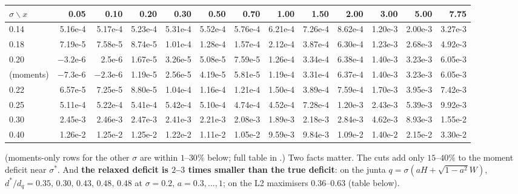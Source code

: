\begin{center}\scriptsize
\begin{adjustbox}{max width=\linewidth}\begin{tabular}{l|rrrrrrrrrrrr}\toprule
$\sigma\backslash x$ & 0.05 & 0.10 & 0.20 & 0.30 & 0.50 & 0.70 & 1.00 & 1.50 & 2.00 & 3.00 & 5.00 & 7.75\\\midrule
0.14 & 5.16e-4 & 5.17e-4 & 5.23e-4 & 5.31e-4 & 5.52e-4 & 5.76e-4 & 6.21e-4 & 7.26e-4 & 8.62e-4 & 1.20e-3 & 2.00e-3 & 3.27e-3\\
0.18 & 7.19e-5 & 7.58e-5 & 8.74e-5 & 1.01e-4 & 1.28e-4 & 1.57e-4 & 2.12e-4 & 3.87e-4 & 6.30e-4 & 1.23e-3 & 2.68e-3 & 4.92e-3\\
0.20 & $-3.2$e-6 & 2.5e-6 & 1.67e-5 & 3.26e-5 & 5.08e-5 & 7.59e-5 & 1.26e-4 & 3.34e-4 & 6.38e-4 & 1.40e-3 & 3.23e-3 & 6.05e-3\\
\quad(moments) & $-7.3$e-6 & $-2.3$e-6 & 1.19e-5 & 2.56e-5 & 4.19e-5 & 5.81e-5 & 1.19e-4 & 3.31e-4 & 6.37e-4 & 1.40e-3 & 3.23e-3 & 6.05e-3\\
0.22 & 6.57e-5 & 7.25e-5 & 8.80e-5 & 1.04e-4 & 1.16e-4 & 1.21e-4 & 1.50e-4 & 3.89e-4 & 7.59e-4 & 1.70e-3 & 3.95e-3 & 7.42e-3\\
0.25 & 5.11e-4 & 5.22e-4 & 5.41e-4 & 5.42e-4 & 5.10e-4 & 4.74e-4 & 4.52e-4 & 7.28e-4 & 1.20e-3 & 2.43e-3 & 5.39e-3 & 9.92e-3\\
0.30 & 2.45e-3 & 2.46e-3 & 2.47e-3 & 2.41e-3 & 2.21e-3 & 2.08e-3 & 1.89e-3 & 2.18e-3 & 2.84e-3 & 4.62e-3 & 8.93e-3 & 1.55e-2\\
0.40 & 1.26e-2 & 1.25e-2 & 1.25e-2 & 1.22e-2 & 1.11e-2 & 1.05e-2 & 9.59e-3 & 9.84e-3 & 1.09e-2 & 1.40e-2 & 2.15e-2 & 3.30e-2\\\bottomrule
\end{tabular}\end{adjustbox}
\end{center}
(moments-only rows for the other $\sigma$ are within $1$--$30\%$ below; full table in .) Two facts matter. The cuts add only $15$--$40\%$ to the moment deficit near
$\sigma^*$. And \textbf{the relaxed deficit is $2$--$3$ times smaller than the true deficit}: on the junta $q=\sigma(aH+\sqrt{1-a^2}W)$, $d^*/d_q=0.35,\,0.30,\,0.43,\,0.48,\,0.48$ at
$\sigma=0.2$, $a=0.3,\dots,1$; on the L2 maximisers $0.36$--$0.63$ (table below).

